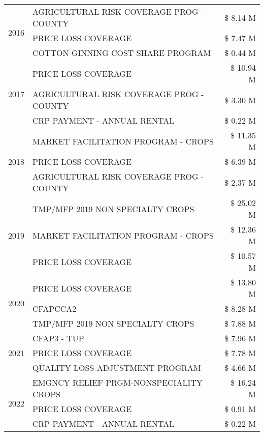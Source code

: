 \begin{tabular}{llr}
\cline{1-3}
\multirow[t]{3}{*}{2016} & AGRICULTURAL RISK COVERAGE PROG - COUNTY & \$ 8.14 M \\
 & PRICE LOSS COVERAGE & \$ 7.47 M \\
 & COTTON GINNING COST SHARE PROGRAM & \$ 0.44 M \\
\cline{1-3}
\multirow[t]{3}{*}{2017} & PRICE LOSS COVERAGE & \$ 10.94 M \\
 & AGRICULTURAL RISK COVERAGE PROG - COUNTY & \$ 3.30 M \\
 & CRP PAYMENT - ANNUAL RENTAL & \$ 0.22 M \\
\cline{1-3}
\multirow[t]{3}{*}{2018} & MARKET FACILITATION PROGRAM - CROPS & \$ 11.35 M \\
 & PRICE LOSS COVERAGE & \$ 6.39 M \\
 & AGRICULTURAL RISK COVERAGE PROG - COUNTY & \$ 2.37 M \\
\cline{1-3}
\multirow[t]{3}{*}{2019} & TMP/MFP 2019 NON SPECIALTY CROPS & \$ 25.02 M \\
 & MARKET FACILITATION PROGRAM - CROPS & \$ 12.36 M \\
 & PRICE LOSS COVERAGE & \$ 10.57 M \\
\cline{1-3}
\multirow[t]{3}{*}{2020} & PRICE LOSS COVERAGE & \$ 13.80 M \\
 & CFAPCCA2 & \$ 8.28 M \\
 & TMP/MFP 2019 NON SPECIALTY CROPS & \$ 7.88 M \\
\cline{1-3}
\multirow[t]{3}{*}{2021} & CFAP3 - TUP & \$ 7.96 M \\
 & PRICE LOSS COVERAGE & \$ 7.78 M \\
 & QUALITY LOSS ADJUSTMENT PROGRAM & \$ 4.66 M \\
\cline{1-3}
\multirow[t]{3}{*}{2022} & EMGNCY RELIEF PRGM-NONSPECIALITY CROPS & \$ 16.24 M \\
 & PRICE LOSS COVERAGE & \$ 0.91 M \\
 & CRP PAYMENT - ANNUAL RENTAL & \$ 0.22 M \\
\cline{1-3}
\bottomrule
\end{tabular}
